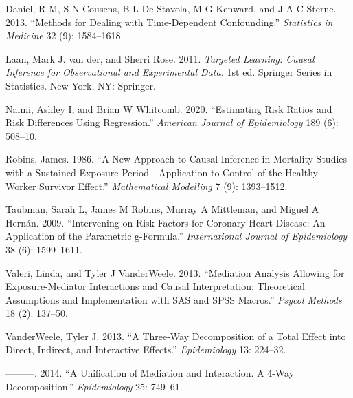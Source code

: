 \documentclass[
]{book}
\newlength{\cslhangindent}
\newlength{\cslentryspacingunit} %
\newenvironment{CSLReferences}[2] %
 {%
  \setlength{\parindent}{0pt}
  \ifodd #1
  \let\oldpar\par
  \def\par{\hangindent=\cslhangindent\oldpar}
  \fi
  \setlength{\parskip}{#2\cslentryspacingunit}
 }%
 {}
\begin{document}
\hypertarget{refs}{}
\begin{CSLReferences}{1}{0}
\leavevmode{}%
Daniel, R M, S N Cousens, B L De Stavola, M G Kenward, and J A C Sterne. 2013. {``Methods for Dealing with Time-Dependent Confounding.''} \emph{Statistics in Medicine} 32 (9): 1584--1618.

\leavevmode{}%
Laan, Mark J. van der, and Sherri Rose. 2011. \emph{Targeted Learning: Causal Inference for Observational and Experimental Data.} 1st ed. Springer Series in Statistics. New York, NY: Springer.

\leavevmode{}%
Naimi, Ashley I, and Brian W Whitcomb. 2020. {``Estimating Risk Ratios and Risk Differences Using Regression.''} \emph{American Journal of Epidemiology} 189 (6): 508--10.

\leavevmode{}%
Robins, James. 1986. {``A New Approach to Causal Inference in Mortality Studies with a Sustained Exposure Period---Application to Control of the Healthy Worker Survivor Effect.''} \emph{Mathematical Modelling} 7 (9): 1393--1512.

\leavevmode{}%
Taubman, Sarah L, James M Robins, Murray A Mittleman, and Miguel A Hernán. 2009. {``Intervening on Risk Factors for Coronary Heart Disease: An Application of the Parametric g-Formula.''} \emph{International Journal of Epidemiology} 38 (6): 1599--1611.

\leavevmode{}%
Valeri, Linda, and Tyler J VanderWeele. 2013. {``Mediation Analysis Allowing for Exposure-Mediator Interactions and Causal Interpretation: Theoretical Assumptions and Implementation with SAS and SPSS Macros.''} \emph{Psycol Methods} 18 (2): 137--50.

\leavevmode{}%
VanderWeele, Tyler J. 2013. {``A Three-Way Decomposition of a Total Effect into Direct, Indirect, and Interactive Effects.''} \emph{Epidemiology} 13: 224--32.

\leavevmode{}%
---------. 2014. {``A Unification of Mediation and Interaction. A 4-Way Decomposition.''} \emph{Epidemiology} 25: 749--61.

\end{CSLReferences}
\end{document}
